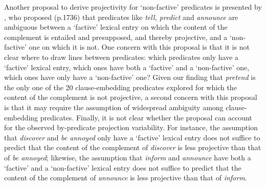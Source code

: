 \documentclass[11pt,fleqn]{article}
\newcommand{\6}{\mbox{$[\hspace*{-.6mm}[$}}
\newcommand{\9}{\mbox{$]\hspace*{-.6mm}]$}}
\begin{document}
{Another proposal to derive projectivity for `non-factive' predicates is presented by \citet{spector-egre2015}, who proposed (p.1736) that predicates like {\em tell, predict} and {\em announce}  are ambiguous between a `factive' lexical entry on which the content of the complement is entailed and presupposed, and thereby projective, and a `non-factive' one on which it is not. One concern with this proposal is that it is not clear where to draw lines between predicates: which predicates only have a `factive' lexical entry, which ones have both a `factive' and a `non-factive' one, which ones have only have a `non-factive' one? Given our finding that {\em pretend} is the only one of the 20 clause-embedding predicates explored for which the content of the complement is not projective, a second concern with this proposal is that it may require the assumption of widespread ambiguity among clause-embedding predicates. Finally, it is not clear whether the proposal can account for the observed by-predicate projection variability. For instance, the assumption that {\em discover} and {\em be annoyed} only have a `factive' lexical entry does not suffice to predict that the content of the complement of {\em discover} is less projective than that of {\em be annoyed}; likewise, the assumption that {\em inform} and {\em announce} have both a `factive' and a `non-factive' lexical entry does not suffice to predict that the content of the complement of {\em announce} is less projective than that of {\em inform}.

}
\end{document}

